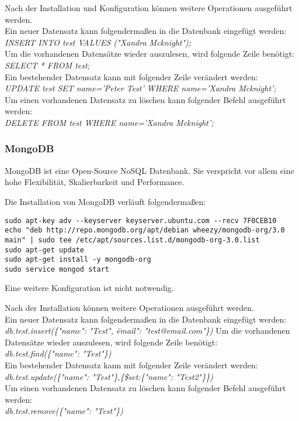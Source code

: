 Nach der Installation und Konfiguration können weitere Operationen ausgeführt werden.\\
Ein neuer Datensatz kann folgendermaßen in die Datenbank eingefügt werden:\\
\textit{INSERT INTO test VALUES ("Xandra Mcknight");}\\
Um die vorhandenen Datensätze wieder auszulesen, wird folgende Zeile benötigt:\\
\textit{SELECT * FROM test;}\\
Ein bestehender Datensatz kann mit folgender Zeile verändert werden:\\
\textit{UPDATE test SET name='Peter Test' WHERE name='Xandra Mcknight';}\\
Um einen vorhandenen Datensatz zu löschen kann folgender Befehl ausgeführt werden:\\
\textit{DELETE FROM test WHERE name='Xandra Mcknight';}

\subsubsection{MongoDB}
MongoDB ist eine Open-Source NoSQL Datenbank. Sie verspricht vor allem eine hohe Flexibilität, Skalierbarkeit und Performance. \cite{ABOUTMONGODB}

Die Installation von MongoDB verläuft folgendermaßen:
\begin{lstlisting}[caption=Installation von MongoDB \cite{MONGODBINSTALL}]
sudo apt-key adv --keyserver keyserver.ubuntu.com --recv 7F0CEB10
echo "deb http://repo.mongodb.org/apt/debian wheezy/mongodb-org/3.0 main" | sudo tee /etc/apt/sources.list.d/mongodb-org-3.0.list
sudo apt-get update
sudo apt-get install -y mongodb-org
sudo service mongod start
\end{lstlisting}
Eine weitere Konfiguration ist nicht notwendig.

Nach der Installation können weitere Operationen ausgeführt werden.\\
Ein neuer Datensatz kann folgendermaßen in die Datenbank eingefügt werden:\\
\textit{db.test.insert(\{"name": "Test", \"email": "test@email.com"\})}
Um die vorhandenen Datensätze wieder auszulesen, wird folgende Zeile benötigt:\\
\textit{db.test.find(\{"name": "Test"\})}\\
Ein bestehender Datensatz kann mit folgender Zeile verändert werden:\\
\textit{db.test.update(\{"name": "Test"\},\{\$set:\{"name": "Test2"\}\})}\\
Um einen vorhandenen Datensatz zu löschen kann folgender Befehl ausgeführt werden:\\
\textit{db.test.remove(\{"name": "Test"\})}

